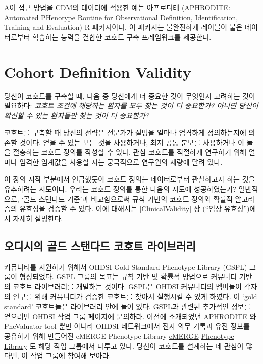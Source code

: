 \documentclass[11pt]{book}
\theoremstyle{definition}
\theoremstyle{definition}
\theoremstyle{definition}
\theoremstyle{remark}
\begin{document}
A이 접근 방법을 CDM의 데이터에 적용한 예는 아프로디테 (APHRODITE:
Automated PHenotype Routine for Observational Definition,
Identification, Training and Evaluation) R 패키지이다. 이 패키지는
불완전하게 레이블이 붙은 데이터로부터 학습하는 능력을 결합한 코호트 구축
프레임워크를 제공한다. \citep{Banda2017APHRODITE} 

\section{Cohort Definition Validity}\label{cohort-definition-validity}

당신이 코호트를 구축할 때, 다음 중 당신에게 더 중요한 것이 무엇인지
고려하는 것이 필요하다: \emph{코호트 조건에 해당하는 환자를 모두 찾는
것이 더 중요한가? 아니면 당신이 확신할 수 있는 환자들만 찾는 것이 더
중요한가?}

코호트를 구축할 때 당신의 전략은 전문가가 질병을 얼마나 엄격하게
정의하는지에 의존할 것이다. 얻을 수 있는 모든 것을 사용하거나, 최저 공통
분모를 사용하거나 이 둘을 절충하는 코호트 정의를 작성할 수 있다. 관심
코호트를 적절하게 연구하기 위해 얼마나 엄격한 임계값을 사용할 지는
궁극적으로 연구원의 재량에 달려 있다.

이 장의 시작 부분에서 언급했듯이 코호트 정의는 데이터로부터 관찰하고자
하는 것을 유추하려는 시도이다. 우리는 코호트 정의를 통한 다음의 시도에
성공하였는가? 일반적으로, `골드 스탠다드 기준'과 비교함으로써 규칙
기반의 코호트 정의와 확률적 알고리즘의 유효성을 검증할 수 있다. 이에
대해서는 \ref{ClinicalValidity} 장 (``임상 유효성'')에서 자세히
설명한다.

\subsection{오디시의 골드 스탠다드 코호트 라이브러리}\label{----}

커뮤니티를 지원하기 위해서 OHDSI Gold Standard Phenotype Library (GSPL)
그룹이 형성되었다. GSPL 그룹의 목표는 규칙 기반 및 확률적 방법으로
커뮤니티 기반의 코호트 라이브러리를 개발하는 것이다. GSPL은 OHDSI
커뮤니티의 멤버들이 각자의 연구를 위해 커뮤니티가 검증한 코호트를 찾아서
실행시킬 수 있게 하였다. 이 `gold standard' 코호트들은 라이브러리 안에
들어 있다. GSPL과 관련된 추가적인 정보를 얻으려면 OHDSI 작업 그룹
페이지에 문의하라. 이전에 소개되었던 APHRODITE
\citep{Banda2017APHRODITE} 와 PheValuator tool
\citep{Swerdel2019phevaluator} 뿐만 아니라 OHDSI 네트워크에서 전자 의무
기록과 유전 정보를 공유하기 위해 만들어진 eMERGE Phenotype Library
\href{https://emerge.mc.vanderbilt.edu/}{eMERGE}
\href{https://phekb.org/phenotypes}{Phenotype Library}
\citep{Hripcsak2019eMERGE} 도 해당 작업 그룹에서 다루고 있다. 당신이
코호트를 설계하는 데 관심이 많다면, 이 작업 그룹에 참여해 보아라.
\end{document}
